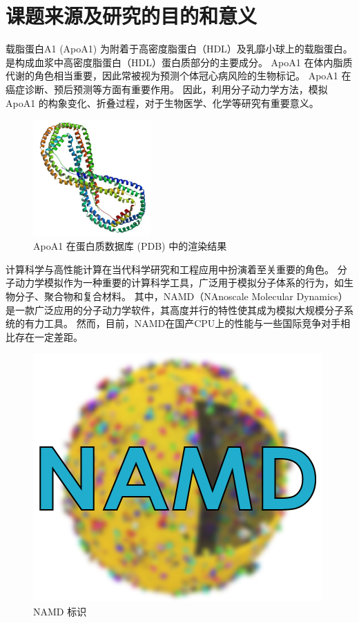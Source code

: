\section{课题来源及研究的目的和意义}

载脂蛋白A1 (ApoA1) 为附着于高密度脂蛋白（HDL）及乳靡小球上的载脂蛋白。
是构成血浆中高密度脂蛋白（HDL）蛋白质部分的主要成分。
ApoA1 在体内脂质代谢的角色相当重要，因此常被视为预测个体冠心病风险的生物标记。
ApoA1 在癌症诊断\cite{limwjxtd}、预后预测\cite{apoayuhz}等方面有重要作用。
因此，利用分子动力学方法，模拟 ApoA1 的构象变化、折叠过程，对于生物医学、化学等研究有重要意义。


\begin{figure}[H]
    \centering
    \includegraphics[width=0.4\textwidth]{images/PBB_Protein_APOA1_image.jpg}
    \caption{ApoA1 在蛋白质数据库 (PDB) 中的渲染结果}
\end{figure}

计算科学与高性能计算在当代科学研究和工程应用中扮演着至关重要的角色。
分子动力学模拟作为一种重要的计算科学工具，广泛用于模拟分子体系的行为，如生物分子、聚合物和复合材料。
其中，NAMD（NAnoscale Molecular Dynamics）\cite{phillips2005scalable}是一款广泛应用的分子动力学软件，其高度并行的特性使其成为模拟大规模分子系统的有力工具。
然而，目前，NAMD在国产CPU上的性能与一些国际竞争对手相比存在一定差距。


\begin{figure}[H]
    \centering
    \includegraphics{images/namd-logo.png}
    \caption{NAMD 标识}
\end{figure}

